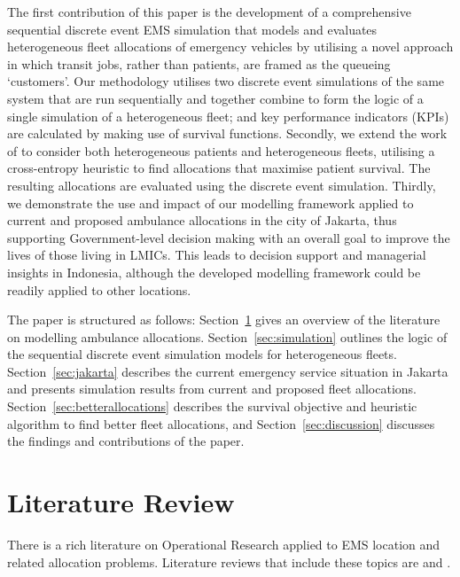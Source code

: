 \documentclass[preprint,12pt]{elsarticle}
\begin{document}
The first contribution of this paper is the development of a comprehensive
sequential discrete event EMS simulation that models and evaluates heterogeneous
fleet allocations of emergency vehicles by utilising a novel approach in which
transit jobs, rather than patients, are framed as the queueing `customers'. Our
methodology utilises two discrete event simulations of the same system that are
run sequentially and together combine to form the logic of a single simulation
of a heterogeneous fleet; and key performance indicators (KPIs) are calculated
by making use of survival functions. Secondly, we extend the work of
\cite{Knight2012918} to consider both heterogeneous patients and heterogeneous
fleets, utilising a cross-entropy heuristic to find allocations that maximise
patient survival. The resulting allocations are evaluated using the discrete
event simulation. Thirdly, we demonstrate the use and impact of our modelling
framework applied to current and proposed ambulance allocations in the city of
Jakarta, thus supporting Government-level decision making with an overall goal
to improve the lives of those living in LMICs.  This leads to decision support
and managerial insights in Indonesia, although the developed modelling framework
could be readily applied to other locations.

The paper is structured as follows: Section~\ref{sec:litreview} gives an
overview of the literature on modelling ambulance allocations.
Section~\ref{sec:simulation} outlines the logic of the sequential discrete event
simulation models for heterogeneous fleets. Section~\ref{sec:jakarta} describes
the current emergency service situation in Jakarta and presents simulation
results from current and proposed fleet allocations.
Section~\ref{sec:betterallocations} describes the survival objective and
heuristic algorithm to find better fleet allocations, and
Section~\ref{sec:discussion} discusses the findings and contributions of the
paper.

\section{Literature Review}\label{sec:litreview}

There is a rich literature on Operational Research applied to EMS location and
related allocation problems. Literature reviews that include these topics are
\citet{aringhieri2017emergency, belanger2019recent, farahani2019or, Li2011,
Liu2021, reuter2017logistics} and  \citet{wang2021emergency}.
\end{document}
